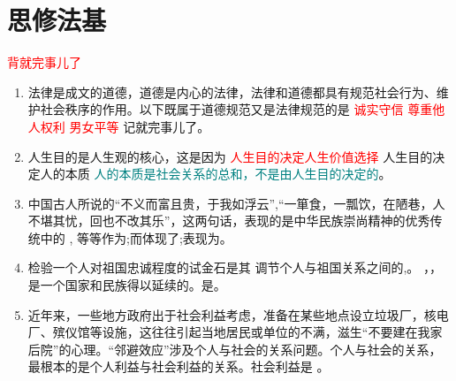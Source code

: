 \section{思修法基}
\textcolor{red}{\faBook 背就完事儿了}

\begin{enumerate}[align=hang, start=1]
	\item 法律是成文的道德，道德是内心的法律，法律和道德都具有规范社会行为、维护社会秩序的作用。以下既属于道德规范又是法律规范的是
	\xx{  	\textcolor{red}{  爱国主义 } }  {  	\textcolor{red}{  诚实守信 }   }   {  	\textcolor{red}{  尊重他人权利 }  }   {  	\textcolor{red}{  男女平等 }   } 
	\note 记就完事儿了。
	
	\item 人生目的是人生观的核心，这是因为
	\xx {  	\textcolor{red}{  人生目的决定人生道路 }}{ 	\textcolor{red}{  人生目的决定人生态度 }  }  { 	\textcolor{red}{   人生目的决定人生价值选择}   } { 人生目的决定人的本质 }  
	\note  \textcolor{ teal}{人的本质是社会关系的总和，不是由人生目的决定的}。
	
	\item 
	中国古人所说的``不义而富且贵，于我如浮云'',``一箪食，一瓢饮，在陋巷，人不堪其忧，回也不改其乐''，这两句话，表现的是中华民族崇尚精神的优秀传统中的
	\note {}, 等等作为;而体现了;表现为。
	
	\item 
	检验一个人对祖国忠诚程度的试金石是其
	\note  {}调节个人与祖国关系之间的,。
	，，是一个国家和民族得以延续的。是。
	
	\item 
	近年来，一些地方政府出于社会利益考虑，准备在某些地点设立垃圾厂，核电厂、殡仪馆等设施，这往往引起当地居民或单位的不满，滋生``不要建在我家后院''的心理。``邻避效应''涉及个人与社会的关系问题。个人与社会的关系，最根本的是个人利益与社会利益的关系。社会利益是
	\note {}。
	

\end{enumerate}
